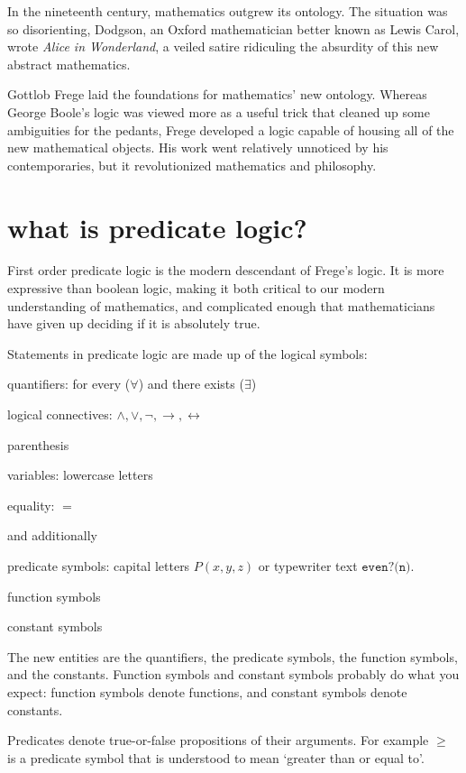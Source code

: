 \documentclass{scrbook}
\renewcommand{\implies}{\to}
\renewcommand{\iff}{\leftrightarrow}
\begin{document}
In the nineteenth century, mathematics outgrew its ontology. The situation was so disorienting, Dodgson, an Oxford mathematician better known as Lewis Carol, wrote \emph{Alice in Wonderland}, a veiled satire ridiculing the absurdity of this new abstract mathematics. \cite{alice}

Gottlob Frege laid the foundations for mathematics' new ontology. Whereas George Boole's logic was viewed more as a useful trick that cleaned up some ambiguities for the pedants, Frege developed a logic capable of housing all of the new mathematical objects. His work went relatively unnoticed by his contemporaries, but it revolutionized mathematics and philosophy. 

\section[What is Predicate Logic?]{what is predicate logic?}
First order predicate logic is the modern descendant of Frege's logic. It is more expressive than boolean logic, making it both critical to our modern understanding of mathematics, and complicated enough that mathematicians have given up deciding if it is absolutely true. 

Statements in predicate logic are made up of the logical symbols:
\begin{trivlist}
\item quantifiers: for every ($\forall$) and there exists ($\exists$)
\item logical connectives: $\wedge,\vee,\neg,\implies,\iff$
\item parenthesis 
\item variables: lowercase letters
\item equality: $=$
\end{trivlist}

and additionally 
\begin{trivlist}
\item predicate symbols: capital letters $P(x,y,z)$ or typewriter text $\texttt{even?(n)}$.
\item function symbols 
\item constant symbols  
\end{trivlist}
The new entities are the quantifiers, the predicate symbols, the function symbols, and the constants. Function symbols and constant symbols probably do what you expect: function symbols denote functions, and constant symbols denote constants. 

Predicates denote true-or-false propositions of their arguments. For example $\geq$ is a predicate symbol that is understood to mean `greater than or equal to'. 
\end{document}
